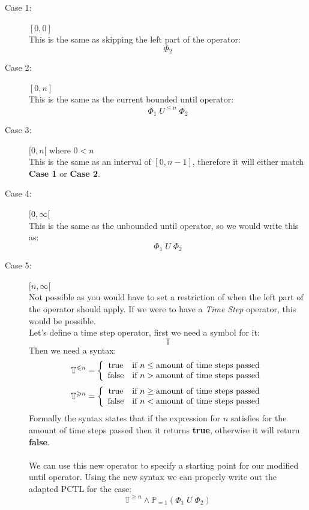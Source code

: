 \documentclass[12pt]{report}
\begin{document}
\begin{description}
	\item[Case 1:] $[0, 0]$\\
	This is the same as skipping the left part of the operator:
	$$\Phi_2$$

	\item[Case 2:] $[0, n]$\\
	This is the same as the current bounded until operator:
	$$\Phi_1\;U^{\leqslant n}\;\Phi_2$$
	
	\item[Case 3:] $[0,n[$ where $0 < n$\\
	This is the same as an interval of $[0, n-1]$, therefore it will either match \textbf{Case 1} or \textbf{Case 2}.
	
	\item[Case 4:] $[0, \infty[$\\
	This is the same as the unbounded until operator, so we would write this as:
	$$\Phi_1\;U\;\Phi_2$$
	
	\item[Case 5:] $[n, \infty[$\\
	Not possible as you would have to set a restriction of when the left part of the operator should apply. If we were to have a \emph{Time Step} operator, this would be possible.\\
	Let's define a time step operator, first we need a symbol for it:
	$$\mathbb{T}$$
	Then we need a syntax:
	$$\mathbb{T}^{\leqslant n} = \left\{
		\begin{array}{c l}
			\text{true} & \text{if } n \leq \text{amount of time steps passed}\\
			\text{false} & \text{if } n > \text{amount of time steps passed}
		\end{array}
	\right.$$
	$$\mathbb{T}^{\geqslant n} = \left\{
		\begin{array}{c l}
			\text{true} & \text{if } n \geq \text{amount of time steps passed}\\
			\text{false} & \text{if } n < \text{amount of time steps passed}
		\end{array}
	\right.$$
	Formally the syntax states that if the expression for $n$ satisfies for the amount of time steps passed then it returns \textbf{true}, otherwise it will return \textbf{false}.\\
	\\
	We can use this new operator to specify a starting point for our modified until operator. Using the new syntax we can properly write out the adapted PCTL for the case:
	$$\mathbb{T}^{\geqslant n} \wedge \mathbb{P}_{=1}\left(\Phi_1\;U\;\Phi_2\right)$$
	

\end{description}
\end{document}
